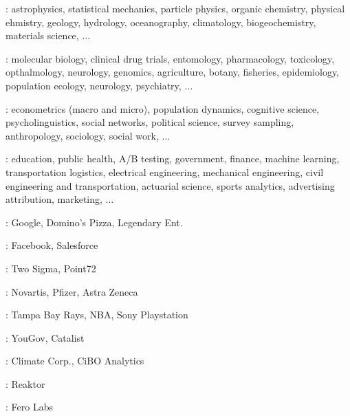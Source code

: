 \documentclass[10pt]{report}
\begin{document}
{
%
\begin{subitemize}
\item {}: {\footnotesize
astrophysics, statistical mechanics, particle physics, organic
chemistry, physical ehmistry, geology, hydrology,
oceanography, climatology, biogeochemistry, materials science, $\ldots$
}
\vspace*{-3pt}
\item {}: {\footnotesize
molecular biology, clinical drug trials, entomology, pharmacology,
toxicology, opthalmology, neurology, genomics, agriculture, botany, fisheries,
epidemiology, population ecology, neurology, psychiatry, $\ldots$
}
\vspace*{-3pt}
\item {}: {\footnotesize
 econometrics (macro and micro), population dynamics, cognitive
 science, psycholinguistics, social networks, political science,
 survey sampling, anthropology, sociology, social work, $\ldots$
}
\vspace*{-3pt}
\item {}: {\footnotesize education, public health, A/B testing,
government, finance, machine learning, transportation logistics,
electrical engineering, mechanical engineering, civil engineering and transportation,
actuarial science, sports analytics, advertising attribution, marketing, $\ldots$}
\end{subitemize}

\vspace*{3pt}
\begin{subitemize}
\item {}: Google, Domino's Pizza, Legendary Ent.
\item {}: Facebook, Salesforce
\item {}: Two Sigma, Point72
\item {}: Novartis, Pfizer, Astra Zeneca
\item {}: Tampa Bay Rays, NBA, Sony Playstation
\item {}: YouGov, Catalist
\item {}: Climate Corp., CiBO Analytics
\item {}: Reaktor
\item {}: Fero Labs
\end{subitemize}


}
\end{document}
